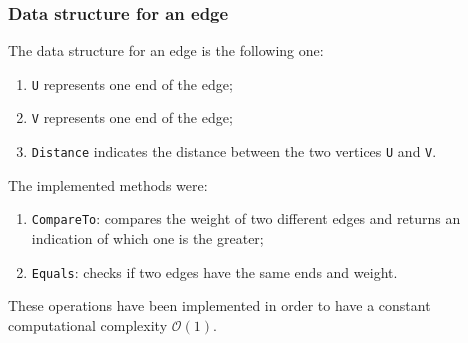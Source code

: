 \subsubsection{Data structure for an edge}
The data structure for an edge is the following one:
\begin{enumerate}
    \item \verb|U| represents one end of the edge;
    \item \verb|V| represents one end of the edge;
    \item \verb|Distance| indicates the distance between the two vertices \verb|U| and \verb|V|.
    \end{enumerate}
\noindent
The implemented methods were:
\begin{enumerate}
    \item \verb|CompareTo|: compares the weight of two different edges and returns an indication of which one is the greater;
    \item \verb|Equals|: checks if two edges have the same ends and weight.
\end{enumerate}
These operations have been implemented in order to have a constant computational complexity $\mathcal{O}(1)$.

